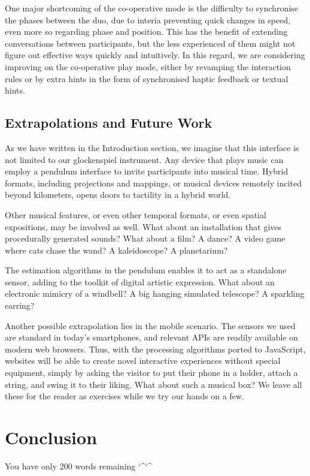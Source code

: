 \documentclass{nime-alternate} %
\begin{document}
One major shortcoming of the co-operative mode is the difficulty to synchronise the phases between the duo, due to interia preventing quick changes in speed, even more so regarding phase and position. This has the benefit of extending conversations between participants, but the less experienced of them might not figure out effective ways quickly and intuitively. In this regard, we are considering improving on the co-operative play mode, either by revamping the interaction rules or by extra hints in the form of synchronised haptic feedback or textual hints.

\subsection{Extrapolations and Future Work}
As we have written in the Introduction section, we imagine that this interface is not limited to our glockenspiel instrument. Any device that plays music can employ a pendulum interface to invite participants into musical time. Hybrid formats, including projections and mappings, or musical devices remotely incited beyond kilometers, opens doors to tactility in a hybrid world.

Other musical features, or even other temporal formats, or even spatial expositions, may be involved as well. What about an installation that gives procedurally generated sounds? What about a film? A dance? A video game where cats chase the wand? A kaleidoscope? A planetarium?

The estimation algorithms in the pendulum enables it to act as a standalone sensor, adding to the toolkit of digital artistic expression. What about an electronic mimicry of a windbell? A big hanging simulated telescope? A sparkling earring?

Another possible extrapolation lies in the mobile scenario. The sensors we used are standard in today's smartphones, and relevant APIs are readily available on modern web browsers. Thus, with the processing algorithms ported to JavaScript, websites will be able to create novel interactive experiences without special equipment, simply by asking the visitor to put their phone in a holder, attach a string, and swing it to their liking. What about such a musical box? We leave all these for the reader as exercises while we try our hands on a few.

\section{Conclusion}
You have only 200 words remaining \char`\^ \char`\^
\end{document}
